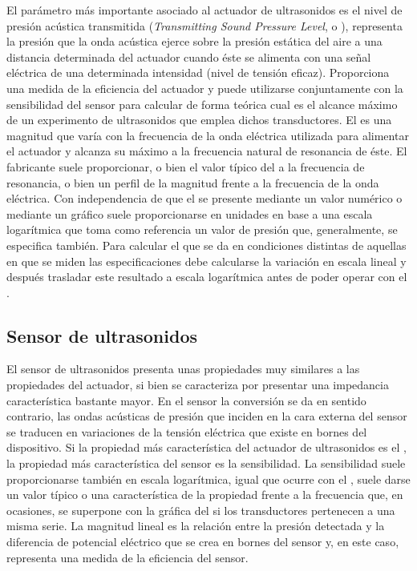 El parámetro más importante asociado al actuador de ultrasonidos es el
nivel de presión acústica transmitida (\emph{Transmitting Sound Pressure
Level}, o ), representa la presión que la onda acústica ejerce
sobre la presión estática del aire a una distancia determinada del actuador
cuando éste se alimenta con una señal eléctrica de una determinada
intensidad (nivel de tensión eficaz). Proporciona una medida de la
eficiencia del actuador y puede utilizarse conjuntamente con la
sensibilidad del sensor para calcular de forma teórica cual es el alcance
máximo de un experimento de ultrasonidos que emplea dichos transductores.
El  es una magnitud que varía con la frecuencia de la onda
eléctrica utilizada para alimentar el actuador y alcanza su máximo a la
frecuencia natural de resonancia de éste. El fabricante suele proporcionar,
o bien el valor típico del  a la frecuencia de resonancia, o bien
un perfil de la magnitud frente a la frecuencia de la onda eléctrica. Con
independencia de que el  se presente mediante un valor numérico o
mediante un gráfico suele proporcionarse en unidades en base a una escala
logarítmica que toma como referencia un valor de presión que, generalmente,
se especifica también. Para calcular el  que se da en condiciones
distintas de aquellas en que se miden las especificaciones debe calcularse
la variación en escala lineal y después trasladar este resultado a escala
logarítmica antes de poder operar con el .


\subsection{Sensor de ultrasonidos}

El sensor de ultrasonidos presenta unas propiedades muy similares a las
propiedades del actuador, si bien se caracteriza por presentar una
impedancia característica bastante mayor. En el sensor la conversión se da
en sentido contrario, las ondas acústicas de presión que inciden en la cara
externa del sensor se traducen en variaciones de la tensión eléctrica que
existe en bornes del dispositivo. Si la propiedad más característica del
actuador de ultrasonidos es el , la propiedad más característica
del sensor es la sensibilidad. La sensibilidad suele proporcionarse también
en escala logarítmica, igual que ocurre con el , suele darse un
valor típico o una característica de la propiedad frente a la frecuencia
que, en ocasiones, se superpone con la gráfica del  si los
transductores pertenecen a una misma serie. La magnitud lineal es la
relación entre la presión detectada y la diferencia de potencial eléctrico
que se crea en bornes del sensor y, en este caso, representa una medida de
la eficiencia del sensor.


